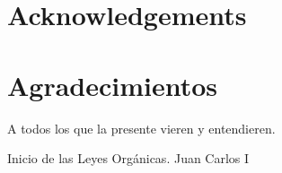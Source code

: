 %
%
%
% 
%
%
%
%

\thispagestyle{empty}

{
  \chapter*{Acknowledgements}
  \label{cha:acknowledgements}
}
{
  \chapter*{Agradecimientos}
  \label{cha:agradecimientos}
}




\begin{FraseCelebre}
  \begin{Frase}
    A todos los que la presente vieren y entendieren.
  \end{Frase}
  \begin{Fuente}
    Inicio de las Leyes Orgánicas. Juan Carlos I
  \end{Fuente}
\end{FraseCelebre}









